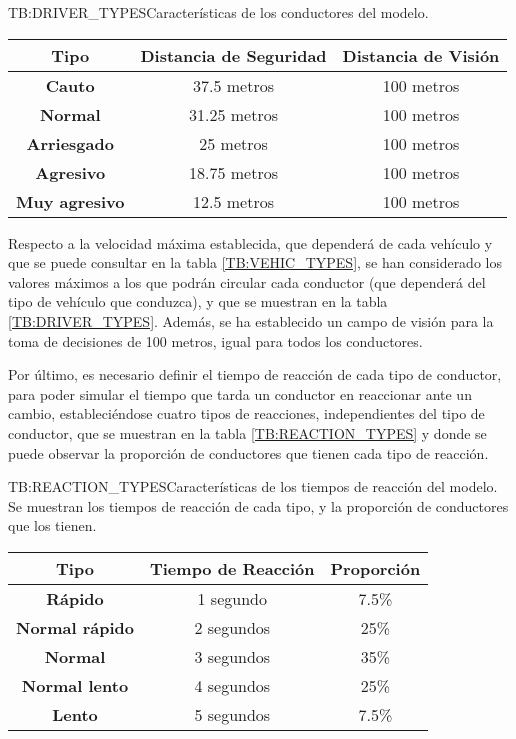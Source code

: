 \begin{table}[Tipos de conductores]{TB:DRIVER_TYPES}{Características de los conductores del modelo.}
    \begin{tabular}{| c | c | c |}
        \hline
        \textbf{Tipo} & \textbf{Distancia de Seguridad} & \textbf{Distancia de Visión}\\
        \hline
        \textbf{Cauto} & 37.5 metros & 100 metros \\
        \hline
        \textbf{Normal} & 31.25 metros & 100 metros \\
        \hline
        \textbf{Arriesgado} & 25 metros & 100 metros \\
        \hline
        \textbf{Agresivo} & 18.75 metros & 100 metros \\
        \hline
        \textbf{Muy agresivo} & 12.5 metros & 100 metros \\
        \hline
    \end{tabular}
\end{table}

Respecto a la velocidad máxima establecida, que dependerá de cada vehículo y que se puede consultar en la tabla \ref{TB:VEHIC_TYPES}, se han considerado los
valores máximos a los que podrán circular cada conductor (que dependerá del tipo de vehículo que conduzca), y que se muestran en la tabla \ref{TB:DRIVER_TYPES}.
Además, se ha establecido un campo de visión para la toma de decisiones de 100 metros, igual para todos los conductores.

Por último, es necesario definir el tiempo de reacción de cada tipo de conductor, para poder simular el tiempo que tarda un conductor en reaccionar ante un cambio,
estableciéndose cuatro tipos de reacciones, independientes del tipo de conductor, que se muestran en la tabla \ref{TB:REACTION_TYPES} y donde se puede observar
la proporción de conductores que tienen cada tipo de reacción.

\begin{table}[Tipos de tiempos de reacción]{TB:REACTION_TYPES}{Características de los tiempos de reacción del modelo. Se muestran los tiempos de reacción de cada tipo, y la proporción de conductores que los tienen.}
    \begin{tabular}{| c | c | c |}
        \hline
        \textbf{Tipo} & \textbf{Tiempo de Reacción} & \textbf{Proporción}\\
        \hline
        \textbf{Rápido} & 1 segundo & 7.5\% \\
        \hline
        \textbf{Normal rápido} & 2 segundos & 25\% \\
        \hline
        \textbf{Normal} & 3 segundos & 35\% \\
        \hline
        \textbf{Normal lento} & 4 segundos & 25\% \\
        \hline
        \textbf{Lento} & 5 segundos & 7.5\% \\
        \hline
    \end{tabular}
\end{table}

